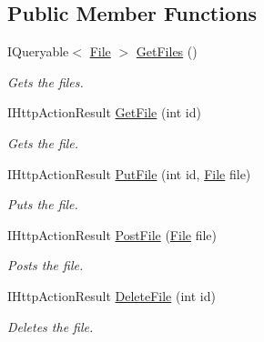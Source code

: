 \subsection*{Public Member Functions}
\begin{DoxyCompactItemize}
\item 
I\+Queryable$<$ \hyperlink{class_open_1_1_g_i_1_1hypermart_1_1_models_1_1_file}{File} $>$ \hyperlink{class_open_1_1_g_i_1_1hypermart_1_1_controllers_1_1_a_p_i_1_1_files_controller_ab9860e1f780182dd01086d07e8bbab65}{Get\+Files} ()
\begin{DoxyCompactList}\small\item\em Gets the files. \end{DoxyCompactList}\item 
I\+Http\+Action\+Result \hyperlink{class_open_1_1_g_i_1_1hypermart_1_1_controllers_1_1_a_p_i_1_1_files_controller_ae232956a5cf1b0d749bb27e96154dfd3}{Get\+File} (int id)
\begin{DoxyCompactList}\small\item\em Gets the file. \end{DoxyCompactList}\item 
I\+Http\+Action\+Result \hyperlink{class_open_1_1_g_i_1_1hypermart_1_1_controllers_1_1_a_p_i_1_1_files_controller_a773d8f70de8b006795b74c1bd921bdb2}{Put\+File} (int id, \hyperlink{class_open_1_1_g_i_1_1hypermart_1_1_models_1_1_file}{File} file)
\begin{DoxyCompactList}\small\item\em Puts the file. \end{DoxyCompactList}\item 
I\+Http\+Action\+Result \hyperlink{class_open_1_1_g_i_1_1hypermart_1_1_controllers_1_1_a_p_i_1_1_files_controller_a4c176da21d23430d23010248e644d61b}{Post\+File} (\hyperlink{class_open_1_1_g_i_1_1hypermart_1_1_models_1_1_file}{File} file)
\begin{DoxyCompactList}\small\item\em Posts the file. \end{DoxyCompactList}\item 
I\+Http\+Action\+Result \hyperlink{class_open_1_1_g_i_1_1hypermart_1_1_controllers_1_1_a_p_i_1_1_files_controller_a0eb8a707a270627264d4c2600e8d7671}{Delete\+File} (int id)
\begin{DoxyCompactList}\small\item\em Deletes the file. \end{DoxyCompactList}\end{DoxyCompactItemize}
